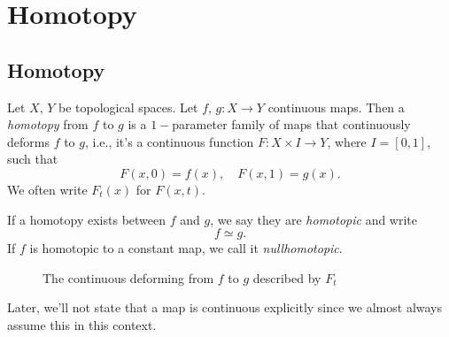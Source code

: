 \section{Homotopy}

\subsection{Homotopy}
\begin{definition}[Homotopy]
	Let \(X\), \(Y\) be topological spaces. Let \(f\), \(g\colon X\to Y\) continuous maps. Then a \emph{homotopy} from \(f\)
	to \(g\) is a \(1-\)parameter family of maps that continuously deforms \(f\) to \(g\), i.e., it's a continuous function
	\(F\colon X\times I\to Y\), where \(I=\left[0,1\right]\), such that
	\[
		F(x, 0) = f(x),\quad F(x, 1) = g(x).
	\]
	We often write \(F_{t}(x)\) for \(F(x, t)\).

	If a homotopy exists between \(f\) and \(g\), we say they are \emph{homotopic} and write
	\[
		f\simeq g.
	\]
	If \(f\) is homotopic to a constant map, we call it \emph{nullhomotopic}.
\end{definition}
\begin{figure}[H]
	\centering
	\caption{The continuous deforming from \(f\) to \(g\) described by \(F_t\)}
	\label{fig:def:homotopy}
\end{figure}

\begin{remark}
	Later, we'll not state that a map is continuous explicitly since we almost always assume this in this context.
\end{remark}

